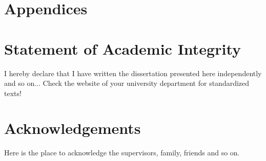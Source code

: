 \documentclass[%
a4paper,12pt,ngerman,UKenglish,twoside]{book}
\begin{document}
\begin{appendices}

\chapter*{Appendices}

\chapter{Statement of Academic Integrity}
I hereby declare that I have written the dissertation presented here independently and so on... Check the website of your university department for standardized texts!

\chapter{Acknowledgements}
Here is the place to acknowledge the supervisors, family, friends and so on.

\end{appendices}
\end{document}
